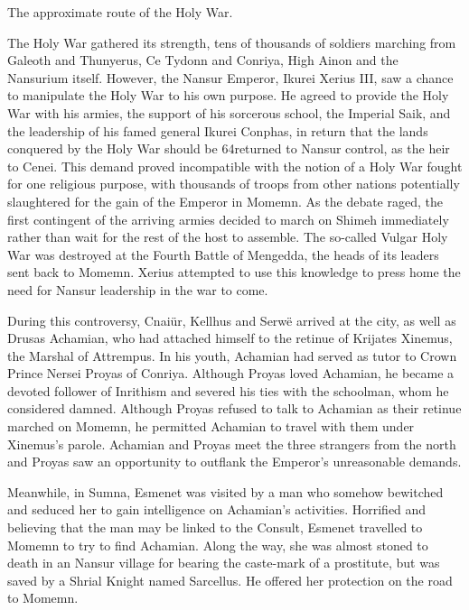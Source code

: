 \documentclass[]{book}
\begin{document}
The approximate route of the Holy War.

The Holy War gathered its strength, tens of thousands of soldiers marching from
Galeoth and Thunyerus, Ce Tydonn and Conriya, High Ainon and the Nansurium
itself. However, the Nansur Emperor, Ikurei Xerius III, saw a chance to manipulate the
Holy War to his own purpose. He agreed to provide the Holy War with his armies, the
support of his sorcerous school, the Imperial Saik, and the leadership of his famed
general Ikurei Conphas, in return that the lands conquered by the Holy War should be
64returned to Nansur control, as the heir to Cenei. This demand proved incompatible
with the notion of a Holy War fought for one religious purpose, with thousands of
troops from other nations potentially slaughtered for the gain of the Emperor in
Momemn. As the debate raged, the first contingent of the arriving armies decided to
march on Shimeh immediately rather than wait for the rest of the host to assemble.
The so-called Vulgar Holy War was destroyed at the Fourth Battle of Mengedda, the
heads of its leaders sent back to Momemn. Xerius attempted to use this knowledge to
press home the need for Nansur leadership in the war to come.

During this controversy, Cnaiür, Kellhus and Serwë arrived at the city, as well as Drusas
Achamian, who had attached himself to the retinue of Krijates Xinemus, the Marshal
of Attrempus. In his youth, Achamian had served as tutor to Crown Prince Nersei
Proyas of Conriya. Although Proyas loved Achamian, he became a devoted follower of
Inrithism and severed his ties with the schoolman, whom he considered damned.
Although Proyas refused to talk to Achamian as their retinue marched on Momemn, he
permitted Achamian to travel with them under Xinemus's parole. Achamian and Proyas
meet the three strangers from the north and Proyas saw an opportunity to outflank the
Emperor's unreasonable demands.

Meanwhile, in Sumna, Esmenet was visited by a man who somehow bewitched and
seduced her to gain intelligence on Achamian's activities. Horrified and believing that
the man may be linked to the Consult, Esmenet travelled to Momemn to try to find
Achamian. Along the way, she was almost stoned to death in an Nansur village for
bearing the caste-mark of a prostitute, but was saved by a Shrial Knight named
Sarcellus. He offered her protection on the road to Momemn.
\end{document}
